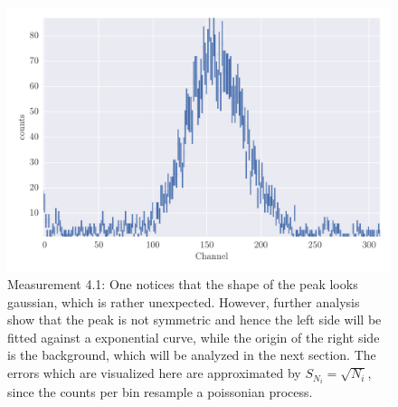 \begin{figure}[htpb]
    \centering
    \includegraphics[width=1.0\linewidth]{analysis/figures/plot4_1}
    \caption{Measurement 4.1: One notices that the shape
        of the peak looks gaussian, which is rather unexpected. However,
        further analysis show that the peak is not symmetric and hence the left 
        side will be fitted against a exponential curve, while the origin of the
        right side is the background, which will be analyzed in the next section.
        The errors which are visualized here are approximated by $S_{N_i} = \sqrt{N_i}$, since
        the counts per bin resample a poissonian process.}
    \label{fig:4_1}
\end{figure}
\clearpage
